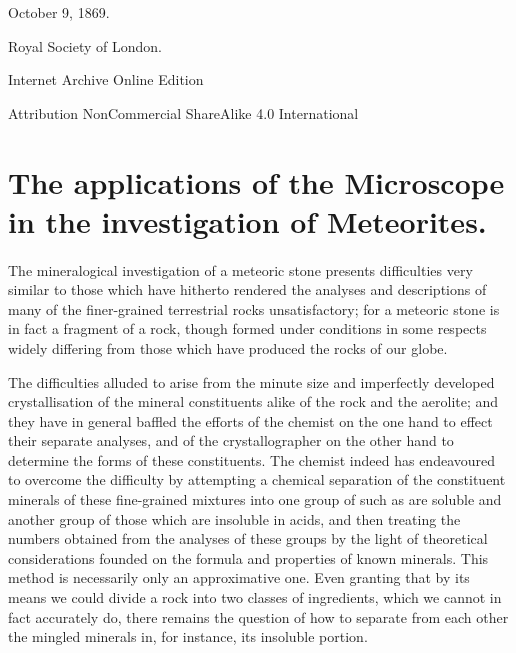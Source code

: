 \documentclass[a4paper, 12pt, oneside]{article}
\begin{document}
\begin{titlepage}
	\vspace*{\fill}%
	
	October 9, 1869. %
	
	{\small Royal Society of London. } %

	\vspace{1\baselineskip} %

    Internet Archive Online Edition  %
	
	{\small Attribution NonCommercial ShareAlike 4.0 International } %
\end{titlepage}
\setlength{\parskip}{1mm plus1mm minus1mm}
\setcounter{tocdepth}{3}
\setcounter{secnumdepth}{3}
\tableofcontents
\clearpage
\section{The applications of the Microscope in the investigation of Meteorites.}
\paragraph{}
The mineralogical investigation of a meteoric stone presents difficulties very similar to those which have hitherto rendered the analyses and descriptions of many of the finer-grained terrestrial rocks unsatisfactory; for a meteoric stone is in fact a fragment of a rock, though formed under conditions in some respects widely differing from those which have produced the rocks of our globe.

The difficulties alluded to arise from the minute size and imperfectly developed crystallisation of the mineral constituents alike of the rock and the aerolite; and they have in general baffled the efforts of the chemist on the one hand to effect their separate analyses, and of the crystallographer on the other hand to determine the forms of these constituents. The chemist indeed has endeavoured to overcome the difficulty by attempting a chemical separation of the constituent minerals of these fine-grained mixtures into one group of such as are soluble and another group of those which are insoluble in acids, and then treating the numbers obtained from the analyses of these groups by the light of theoretical considerations founded on the formula and properties of known minerals. This method is necessarily only an approximative one. Even granting that by its means we could divide a rock into two classes of ingredients, which we cannot in fact accurately do, there remains the question of how to separate from each other the mingled minerals in, for instance, its insoluble portion.
\end{document}
